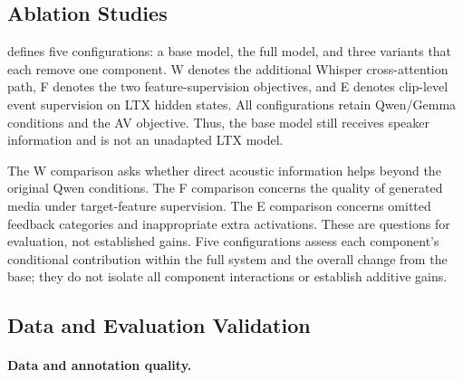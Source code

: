 \subsection{Ablation Studies}
\label{sec:ablation}
 defines five configurations: a base model, the full model, and three variants that each remove one component. W denotes the additional Whisper cross-attention path, F denotes the two feature-supervision objectives, and E denotes clip-level event supervision on LTX hidden states. All configurations retain Qwen/Gemma conditions and the AV objective. Thus, the base model still receives speaker information and is not an unadapted LTX model.

The W comparison asks whether direct acoustic information helps beyond the original Qwen conditions. The F comparison concerns the quality of generated media under target-feature supervision. The E comparison concerns omitted feedback categories and inappropriate extra activations. These are questions for evaluation, not established gains. Five configurations assess each component's conditional contribution within the full system and the overall change from the base; they do not isolate all component interactions or establish additive gains.



\subsection{Data and Evaluation Validation}
\label{sec:validation}
\paragraph{Data and annotation quality.}


